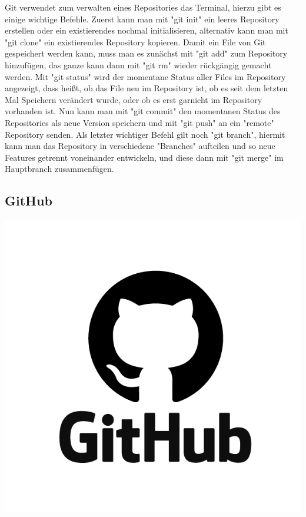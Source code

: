 Git verwendet zum verwalten eines Repositories das Terminal, hierzu gibt es einige wichtige Befehle. Zuerst kann man mit "git init" ein leeres Repository erstellen 
oder ein existierendes nochmal initialisieren, alternativ kann man mit "git clone" ein existierendes Repository kopieren. Damit ein File von Git gespeichert werden
kann, muss man es zunächst mit "git add" zum Repository hinzufügen, das ganze kann dann mit "git rm" wieder rückgängig gemacht werden. Mit "git status" wird der 
momentane Status aller Files im Repository angezeigt, dass heißt, ob das File neu im Repository ist, ob es seit dem letzten Mal Speichern verändert wurde, oder ob es 
erst garnicht im Repository vorhanden ist. Nun kann man mit "git commit" den momentanen Status des Repositories als neue Version speichern und mit "git push" an ein "remote" 
Repository senden. Als letzter wichtiger Befehl gilt noch "git branch", hiermit kann man das Repository in verschiedene "Branches" aufteilen und so neue Features getrennt voneinander
entwickeln, und diese dann mit "git merge" im Hauptbranch zusammenfügen.
\cite{sysarch-git-2}

\subsection{GitHub}
\includegraphics[scale=0.05]{pics/github.png}

